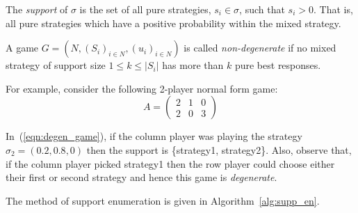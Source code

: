 \newpage
\begin{definition}
    The \emph{support} of \(\sigma \) is the set of all pure strategies, \(s_{i}
    \in \sigma \), such that \(s_{i} > 0\). That is, all pure strategies which
    have a positive probability within the mixed strategy.
\end{definition}

\begin{definition}\label{def:non_degen}
    A game \(G = (N, {(S_{i})}_{i \in N}, {(u_{i})}_{i \in N})\)
    is called \emph{non-degenerate} if no mixed strategy of support size \(1 \le
    k \le |S_{i}|\) has more than \(k\) pure best responses.
\end{definition}

For example, consider the following 2-player normal form game:
\begin{equation}\label{eqn:degen_game}
        A = \begin{pmatrix}
                2 & 1 & 0\\
                2 & 0 & 3
        \end{pmatrix}
\end{equation}


In~(\ref{eqn:degen_game}), if the column player was playing the strategy \(\sigma_{2} = (0.2, 0.8,
0)\) then the support is \{strategy1, strategy2\}. Also, observe that, if the
column player picked strategy1 then the row player could choose either their
first or second strategy and hence this game is \textit{degenerate}. 

The method of support enumeration is given in Algorithm~\ref{alg:supp_en}.

